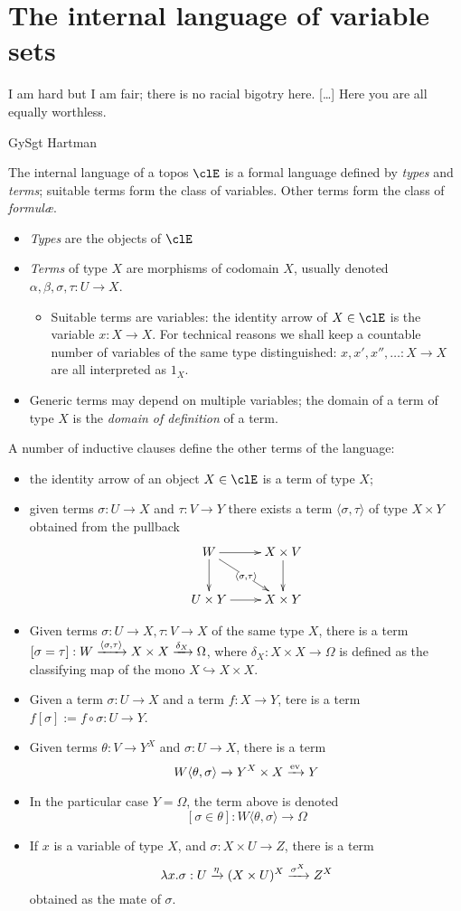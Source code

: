 \documentclass{amsart}
\def\la{\langle}
\def\ra{\rangle}
\def\lr#1#2{\la #1,#2\ra}
\begin{document}
\section{The internal language of variable sets}
\epigraph{I am hard but I am fair; there is no racial bigotry here. [\dots\unkern] Here you are all equally worthless.}{GySgt Hartman}
The internal language of a topos $\clE$ is a formal language defined by \emph{types} and \emph{terms}; suitable terms form the class of variables. Other terms form the class of \emph{formul\ae}.
\begin{itemize}
  \item \emph{Types} are the objects of $\clE$
  \item \emph{Terms} of type $X$ are morphisms of codomain $X$, usually denoted $\alpha,\beta,\sigma,\tau : U \to X$.
        \begin{itemize}
          \item Suitable terms are variables: the identity arrow of $X\in\clE$ is the variable  $x : X \to X$. For technical reasons we shall keep a countable number of variables of the same type distinguished: $x,x',x'',\dots : X \to X$ are all interpreted as $1_X$.
        \end{itemize}
  \item Generic terms may depend on multiple variables; the domain of a term of type $X$ is the \emph{domain of definition} of a term.
\end{itemize}
A number of inductive clauses define the other terms of the language:
\begin{itemize}
  \item the identity arrow of an object $X\in\clE$ is a term of type $X$;
  \item given terms $\sigma : U \to X$ and $\tau :  V\to Y$ there exists a term $\lr{\sigma}{\tau}$ of type $X\times Y$ obtained from the pullback
        \[\xymatrix{
          W \ar[d]\ar[r]\ar[dr]|{\lr{\sigma}{\tau}} & X \times V \ar[d]\\
          U\times Y \ar[r]& X\times Y
          }\]
  \item Given terms $\sigma : U \to X, \tau : V \to X$ of the same type $X$, there is a term $[\sigma = \tau] : W \xto{\lr{\sigma}{\tau}} X\times X \xto{\delta_X} \Omega$, where $\delta_X : X\times X \to \Omega$ is defined as the classifying map of the mono $X \hookrightarrow X\times X$.
  \item Given a term $\sigma : U \to X$ and a term $f : X \to Y$, tere is a term $f[\sigma] := f\circ\sigma : U \to Y$.
  \item Given terms $\theta :  V \to Y^X$ and $\sigma : U\to X$, there is a term
        \[
          W\lr{\theta}{\sigma} \xto{}Y^X\times X \xto{\text{ev}} Y
        \]
  \item In the particular case $Y=\Omega$, the term above is denoted
        \[[\sigma\in\theta] : W\lr{\theta}{\sigma} \to \Omega\]
  \item If $x$ is a variable of type $X$, and $\sigma : X\times U \to Z$, there is a term
        \[\lambda x.\sigma : U \xrightarrow{\eta} (X\times U)^X \xrightarrow{\sigma^X} Z^X\]
        obtained as the mate of $\sigma$.
\end{itemize}
\end{document}
